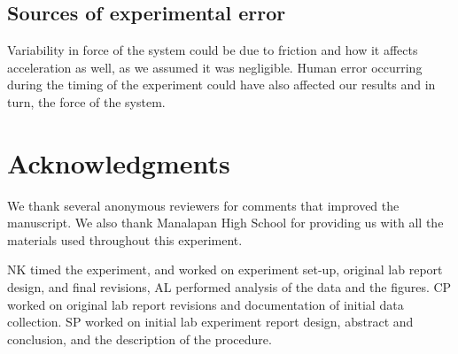 ﻿\documentclass[reprint,amsmath,amssymb,aps]{revtex4-2}
\begin{document}
\subsection{Sources of experimental error}
Variability in force of the system could be due to friction and how it affects acceleration as well, as we assumed it was negligible. Human error occurring during the timing of the experiment could have also affected our results and in turn, the force of the system. 

\section{Acknowledgments}
We thank several anonymous reviewers for comments that improved the manuscript. We also thank Manalapan High School for providing us with all the materials used throughout this experiment. 

NK timed the experiment, and worked on experiment set-up, original lab report design, and final revisions, AL performed analysis of the data and the figures. CP worked on original lab report revisions and documentation of initial data collection. SP worked on initial lab experiment report design, abstract and conclusion, and the description of the procedure. 




%

\end{document}
